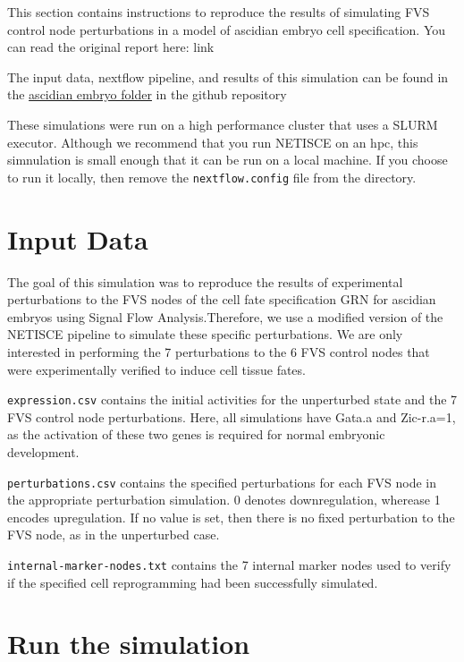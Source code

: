 \documentclass[
]{book}
\theoremstyle{definition}
\theoremstyle{definition}
\theoremstyle{definition}
\theoremstyle{definition}
\theoremstyle{remark}
\begin{document}
This section contains instructions to reproduce the results of simulating FVS control node perturbations in a model of ascidian embryo cell specification. You can read the original report here: link

The input data, nextflow pipeline, and results of this simulation can be found in the \href{https://github.com/VeraLiconaResearchGroup/Netisce/ascidian_embryo}{ascidian embryo folder} in the github repository

These simulations were run on a high performance cluster that uses a SLURM executor. Although we recommend that you run NETISCE on an hpc, this simnulation is small enough that it can be run on a local machine. If you choose to run it locally, then remove the \texttt{nextflow.config} file from the directory.

\hypertarget{input-data}{%
\section{Input Data}\label{input-data}}

The goal of this simulation was to reproduce the results of experimental perturbations to the FVS nodes of the cell fate specification GRN for ascidian embryos using Signal Flow Analysis.Therefore, we use a modified version of the NETISCE pipeline to simulate these specific perturbations.
We are only interested in performing the 7 perturbations to the 6 FVS control nodes that were experimentally verified to induce cell tissue fates.

\texttt{expression.csv} contains the initial activities for the unperturbed state and the 7 FVS control node perturbations. Here, all simulations have Gata.a and Zic-r.a=1, as the activation of these two genes is required for normal embryonic development.

\texttt{perturbations.csv} contains the specified perturbations for each FVS node in the appropriate perturbation simulation. 0 denotes downregulation, wherease 1 encodes upregulation. If no value is set, then there is no fixed perturbation to the FVS node, as in the unperturbed case.

\texttt{internal-marker-nodes.txt} contains the 7 internal marker nodes used to verify if the specified cell reprogramming had been successfully simulated.

\hypertarget{run-the-simulation}{%
\section{Run the simulation}\label{run-the-simulation}}
\end{document}
